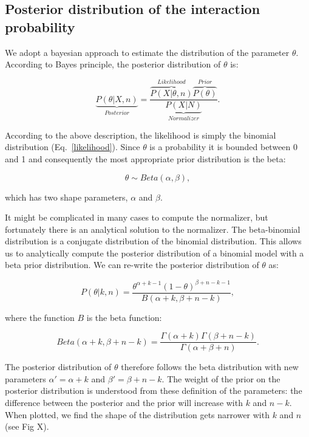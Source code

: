 \documentclass[12pt]{article}
\begin{document}
    \subsection*{Posterior distribution of the interaction probability}

  We adopt a bayesian approach to estimate the distribution of the parameter $\theta$. According to Bayes principle, the posterior distribution of $\theta$ is:

  \begin{equation}
    \underbrace{P(\theta|X,n)}_{Posterior} = \frac{\overbrace{P(X|\theta,n)}^{Likelihood}\overbrace{P(\theta)}^{Prior}}{\underbrace{P(X|N)}_{Normalizer}} .
    \label{posterior}
  \end{equation}

  According to the above description, the likelihood is simply the binomial distribution (Eq.~\ref{likelihood}). Since $\theta$ is a probability it is bounded between 0 and 1 and consequently the most appropriate prior distribution is the beta:

    \begin{equation}
      \theta \sim Beta(\alpha,\beta) , \label{prior}
    \end{equation}


  \noindent which has two shape parameters, $\alpha$ and $\beta$. 


  It might be complicated in many cases to compute the normalizer, but fortunately there is an analytical solution to the normalizer. The beta-binomial distribution is a conjugate distribution of the binomial distribution. This allows us to analytically compute the posterior distribution of a binomial model with a beta prior distribution. We can re-write the posterior distribution of $\theta$ as:


  \begin{equation}
    P(\theta|k,n) = \frac{\theta^{\alpha+k-1}(1-\theta)^{\beta+n-k-1}}{B(\alpha+k,\beta+n-k)} , \label{posterior}
  \end{equation}

  \noindent where the function $B$ is the beta function:

  \begin{equation}
    Beta(\alpha+k,\beta+n-k) = \frac{\Gamma(\alpha+k)\Gamma(\beta+n-k)}{\Gamma(\alpha+\beta+n)} . \label{betafunction}
  \end{equation}

  The posterior distribution of $\theta$ therefore follows the beta distribution with new parameters $\alpha'= \alpha+k$ and $\beta'=\beta+n-k$. The weight of the prior on the posterior distribution is understood from these definition of the parameters: the difference between the posterior and the prior will increase with $k$ and $n-k$. When plotted, we find the shape of the distribution gets narrower with $k$ and $n$ (see Fig X). 
\end{document}

